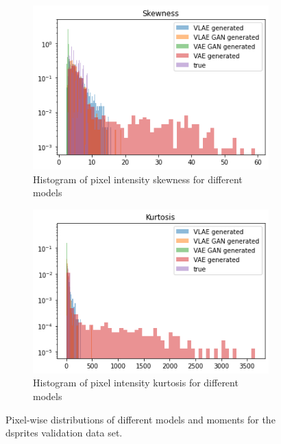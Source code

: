 \begin{figure}
    \hfill
    \begin{subfigure}{0.4\textwidth}
        \centering
        \includegraphics[width=\textwidth]{images/generated_vs_true/dsprites/dsprites_vs_models_skew.png}
        \caption{Histogram of pixel intensity skewness for different models}
        \label{subfig:skew_generated_vs_true_dsprites}
    \end{subfigure}
    \hfill
    \begin{subfigure}{0.4\textwidth}
        \centering
        \includegraphics[width=\textwidth]{images/generated_vs_true/dsprites/dsprites_vs_models_kurt.png}
        \caption{Histogram of pixel intensity kurtosis for different models}
        \label{subfig:kurt_generated_vs_true_dsprites}
    \end{subfigure}
    \caption[Models on dsprites: Pixel-wise distributions]{Pixel-wise distributions of different models and moments for the dsprites validation data set.}
    \label{fig:mean_generated_vs_true_dsprites}
\end{figure}

